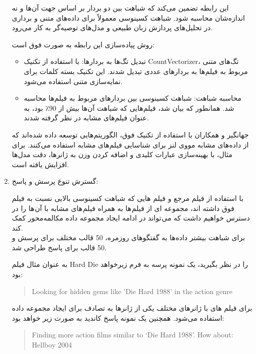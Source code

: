 \begin{enumerate}
این رابطه تضمین می‌کند که شباهت بین دو بردار بر اساس جهت آن‌ها و نه اندازه‌شان محاسبه شود. شباهت کسینوسی معمولاً برای داده‌های متنی و برداری در تحلیل‌های پردازش زبان طبیعی و مدل‌های توصیه‌گر به کار می‌رود.

روش پیاده‌سازی این رابطه به صورت فوق است:
\begin{itemize}
\item
تبدیل تگ‌ها به بردارها: با استفاده از تکنیک CountVectorizer، تگ‌های متنی مربوط به فیلم‌ها به بردارهای عددی تبدیل شدند. این تکنیک بسته کلمات%
 برای نمایه‌سازی متنی استفاده می‌شود.
\item
محاسبه شباهت: شباهت کسینوسی بین بردارهای مربوط به فیلم‌ها محاسبه شد. همانطور که بیان شد، فیلم‌هایی که شباهت آن‌ها بیش از 90٪ بود، به عنوان فیلم‌های مشابه در نظر گرفته شدند.
\end{itemize}

جهانگیر و همکاران%
\cite{singh2020movie}
 با استفاده از تکنیک فوق، الگوریتم‌هایی توسعه داده شده‌اند که از داده‌های مشابه مووی لنز برای شناسایی فیلم‌های مشابه استفاده می‌کنند. برای مثال، با بهینه‌سازی عبارات کلیدی و اضافه کردن وزن به ژانرها، دقت مدل‌ها افزایش یافته است.


\item
گسترش تنوع پرسش و پاسخ:

با استفاده از فیلم مرجع و فیلم هایی که شباهت کسینوسی بالایی نسبت به فیلم فوق داشته اند، مجموعه ای از فیلم ها به همراه فیلم های مشابه با آن ها را در دسترس خواهیم داشت که می تواند در ادامه ایجاد مجموعه داده مکالمه‌محور کمک کند.\\
برای شباهت بیشتر داده‌ها به گفتگوهای روزمره، 50 قالب مختلف برای پرسش و 50 قالب برای پاسخ طراحی شد.


به عنوان مثال فیلم Hard Die را در نظر بگیرید، یک نمونه پرسه به فرم زیرخواهد بود:
\begin{quote}
\begin{LTR}
Looking for hidden gems like 'Die Hard 1988' in the action genre
\end{LTR}
\end{quote}

برای فیلم های با ژانرهای مختلف یکی از ژانرها به تصادف برای ایجاد مجموعه داده استفاده می‌شود.
همچنین یک نمونه پاسخ کاندید به صورت زیر خواهد بود:
\begin{quote}
\begin{LTR}
Finding more action films similar to ‘Die Hard 1988'. How about: Hellboy 2004
\end{LTR}
\end{quote}



\end{enumerate}
